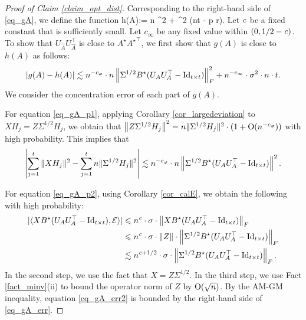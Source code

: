 	\begin{proof}[Proof of Claim \ref{claim_opt_dist}]
	Corresponding to the right-hand side of \eqref{eq_gA}, we define the function
	\be\label{same_hA}h(A):= n ^2 + \sigma^2 (n\cdot t - p \cdot r).\ee
	Let ${\mathit{c}}$ be a fixed constant that is sufficiently small.
	Let $c_{\infty}$ be any fixed value within $(0, 1/2 - {\mathit{c}})$.
	To show that $U_{\hat{A}}U_{\hat{A}}^\top$ is close to $A^\star {A^\star}^\top$, we first show that $g(A)$ is close to $h(A)$ as follows:
	\begin{align}\label{eq_gA_err}
		{\left| {g(A) - h(A)} \right|} \lesssim  n^{-c_{\varphi}} \cdot n \left\| \Sigma^{1/2} B^{\star} (U_AU_A^{\top} - \operatorname{Id}_{t\times t}) \right\|_F^2 + n^{-c_{\infty}} \cdot \sigma^2 \cdot n \cdot t.
	\end{align}
	We consider the concentration error of each part of $g(A)$.

	For equation \eqref{eq_gA_p1}, %
	applying Corollary \ref{cor_largedeviation} to $X H_j = Z \Sigma^{1/2} H_j$, we obtain that 
	${\left\|Z \Sigma^{1/2} H_j \right\|^2 } = { n \|\Sigma^{1/2} H_j\|^2} \cdot (1 + \operatorname{O}(n^{-c_\varphi}))$ with high probability. 
	This implies that
	\begin{align}
		\left\lvert\sum_{j=1}^t \|X H_j\|^2 -  \sum_{j=1}^t n\|\Sigma^{1/2} H_j\|^2\right\rvert \lesssim   n^{-c_{\varphi}} \cdot n  \left\| \Sigma^{1/2} B^{\star} (U_{A}U_A^{\top} - \operatorname{Id}_{t\times t}) \right\|^2. \label{eq_gA_err1}
	\end{align}

	For equation \eqref{eq_gA_p2}, 
	using Corollary \ref{cor_calE}, we obtain the following with high probability:
	\begin{align}
		|\langle XB^{\star} (U_AU_A^{\top} - \operatorname{Id}_{t\times t}), \mathcal{E} \rangle| &\leqslant n^{\mathit{c}} \cdot \sigma \cdot \left\| XB^{\star} (U_AU_A^{\top} - \operatorname{Id}_{t\times t}) \right\|_{F} \nonumber \\
		&\leqslant n^{{\mathit{c}}} \cdot \sigma \cdot \|Z\| \cdot \left\| \Sigma^{1/2} B^{\star}(U_AU_A^{\top} -\operatorname{Id}_{t\times t}) \right\|_{F} \nonumber \\
		&\lesssim n^{{\mathit{c}} + 1/2} \cdot \sigma \cdot \left\| \Sigma^{1/2} B^{\star}(U_AU_A^{\top} -\operatorname{Id}_{t\times t}) \right\|_{F} . \label{eq_gA_err2}
	\end{align}
	In the second step, we use the fact that $X=Z\Sigma^{1/2}$.
	In the third step, we use Fact \ref{fact_minv}(ii) to bound the operator norm of $Z$ by $\operatorname{O}(\sqrt{n})$.
	By the AM-GM inequality, equation \eqref{eq_gA_err2} is bounded by the right-hand side of \eqref{eq_gA_err}.


\end{proof}
